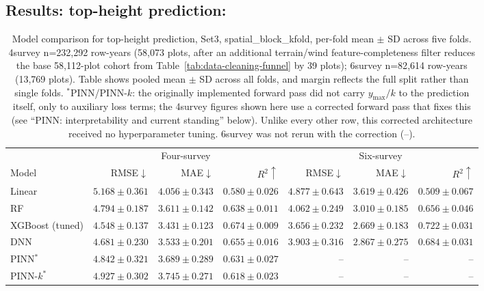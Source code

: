 \documentclass[logo,msc,ai]{infthesis}           %
\begin{document}
\subsection{Results: top-height prediction:}
\begin{table}[!htbp]
\centering
\scriptsize
\setlength{\tabcolsep}{4pt}
\renewcommand{\arraystretch}{1.2}
\begin{tabular}{lrrrrrr}
\toprule
& \multicolumn{3}{c}{Four-survey} & \multicolumn{3}{c}{Six-survey} \\
\cmidrule(lr){2-4} \cmidrule(lr){5-7}
Model & RMSE${\downarrow}$ & MAE${\downarrow}$ & $R^2{\uparrow}$ & RMSE${\downarrow}$ & MAE${\downarrow}$ & $R^2{\uparrow}$ \\
\midrule
Linear & $5.168{\pm}0.361$ & $4.056{\pm}0.343$ & $0.580{\pm}0.026$ & $4.877{\pm}0.643$ & $3.619{\pm}0.426$ & $0.509{\pm}0.067$ \\
RF & $4.794{\pm}0.187$ & $3.611{\pm}0.142$ & $0.638{\pm}0.011$ & $4.062{\pm}0.249$ & $3.010{\pm}0.185$ & $0.656{\pm}0.046$ \\
XGBoost (tuned) & $\mathbf{4.548{\pm}0.137}$ & $\mathbf{3.431{\pm}0.123}$ & $\mathbf{0.674{\pm}0.009}$ & $\mathbf{3.656{\pm}0.232}$ & $\mathbf{2.669{\pm}0.183}$ & $\mathbf{0.722{\pm}0.031}$ \\
DNN & $4.681{\pm}0.230$ & $3.533{\pm}0.201$ & $0.655{\pm}0.016$ & $3.903{\pm}0.316$ & $2.867{\pm}0.275$ & $0.684{\pm}0.031$ \\
PINN$^*$ & $4.842{\pm}0.321$ & $3.689{\pm}0.289$ & $0.631{\pm}0.027$ & -- & -- & -- \\
PINN-$k^*$ & $4.927{\pm}0.302$ & $3.745{\pm}0.271$ & $0.618{\pm}0.023$ & -- & -- & -- \\
\bottomrule
\end{tabular}
\caption{\small{Model comparison for top-height prediction, Set3, spatial\_block\_kfold,
per-fold mean $\pm$ SD across five folds. 4survey n=232{,}292 row-years (58{,}073
plots, after an additional terrain/wind feature-completeness filter reduces the base
58{,}112-plot cohort from Table~\ref{tab:data-cleaning-funnel} by 39 plots); 6survey n=82{,}614 row-years (13{,}769 plots). Table shows pooled mean $\pm$ SD across all folds, and margin reflects the full split rather than single folds.
$^*$PINN/PINN-$k$: the originally implemented forward pass did not carry
$y_{\max}/k$ to the prediction itself, only to auxiliary loss terms; the
4survey figures shown here use a corrected forward pass that fixes this (see
``PINN: interpretability and current standing'' below). Unlike every other
row, this corrected architecture received no hyperparameter tuning. 6survey
was not rerun with the correction (--).}}
\label{tab:results-q3}
\end{table}
\end{document}
